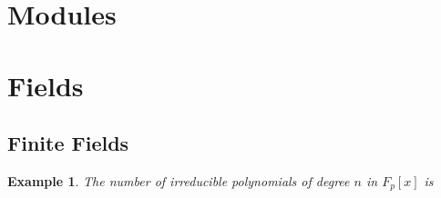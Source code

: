 \documentclass{article}
\newtheorem{Eg}{Example}[section]
\theoremstyle{definition}
\begin{document}
\section{Modules}

\section{Fields}
\subsection{Finite Fields}
\begin{Eg}
    The number of irreducible polynomials of degree $n$ in $F_p[x]$ is 
\end{Eg}
\end{document}
